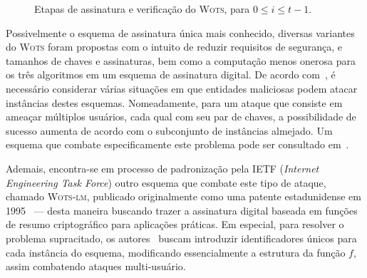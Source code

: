 \documentclass[12pt]{report}
\begin{document}
\begin{figure}[ht]
  \centering
  \caption{Etapas de assinatura e verificação do \textsc{Wots},
    para $0 \leq i \leq t - 1$.}
  \label{fig:5}
\end{figure}

Possivelmente o esquema de assinatura única mais conhecido, diversas variantes do
\textsc{Wots} foram propostas com o intuito de reduzir requisitos de segurança,
e tamanhos de chaves e assinaturas, bem como a computação menos onerosa para os
três algoritmos em um esquema de assinatura digital. De acordo
com~\cite{LafrancePhilip2017}, é necessário considerar várias situações em que
entidades maliciosas podem atacar instâncias destes esquemas. Nomeadamente, para
um ataque que consiste em ameaçar múltiplos usuários, cada qual com seu par de
chaves, a possibilidade de sucesso aumenta de acordo com o subconjunto de
instâncias almejado. Um esquema que combate especificamente este problema pode
ser consultado em~\cite{Hulsing:2016:MMA:3081852.3081871}.

Ademais, encontra-se em processo de padronização pela IETF (\emph{Internet Engineering Task
Force}) outro esquema que combate este tipo de ataque, chamado \textsc{Wots-lm}, publicado
originalmente como uma patente estadunidense em 1995~\cite{lm-patent} --- desta maneira
buscando trazer a assinatura digital baseada em funções de resumo criptográfico
para aplicações práticas. Em especial, para resolver o problema supracitado, os
autores~\cite{mcgrew-hash-sigs-08} buscam introduzir identificadores únicos para cada instância do
esquema, modificando essencialmente a estrutura da função $f$, assim combatendo
ataques multi-usuário.
\end{document}
